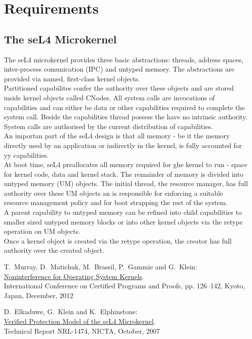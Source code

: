 \documentclass[pdftex,12pt,a4paper]{article}
\begin{document}
	
	\clearpage
	
	\section{Requirements}
	\subsection{The seL4 Microkernel}
	The seL4 microkernel provides three basic abstractions: threads, address spaces, inter-process comunication (IPC) and untyped memory. The abstractions are provided via named, first-class kernel objects. \\
	Partitioned capabilites confer the authority over these objects and are stored inside kernel objects called CNodes. 
	All system calls are invocations of capabilities and can either be data or other capabilities required to complete the system call. 
	Beside the capabilities thread possess the have no intrinsic authority. System calls are authorised by the current distribution of capabilities. \\
	An importan part of the seL4 design is that all memory - be it the memory directly used by an application or indirectly in the kernel, is fully accounted for yy capabilities. \\
	At boot time, seL4 preallocates all memory required for ghe kernel to run - space for kernel code, data and kernel stack. The remainder of memory is divided into untyped memory (UM) objects. The initial thread, the resource manager, has full authority over these UM objects an is responsible for enforcing a suitable resource management policy and for boot strapping the rest of the system. \\
	A parent capability to untyped memory can be refined into child capabilities to smaller sized untyped memory
blocks or into other kernel objects via the retype operation on UM objects. \\
Once a kernel object is created via the retype operation, the creator has full authority over the created object.
	
	
	\cleardoublepage
	\begin{thebibliography}{99}

	T.\ Murray, D.\ Matichuk, M.\ Brassil, P.\ Gammie and G.\ Klein:	\\ 
	\href{http://www.ssrg.nicta.com/publications/nicta_full_text/6004.pdf}{%
		Noninterference for Operating System Kernels}. \\
    International Conference on Certified Programs and Proofs, pp. 126–142, Kyoto, Japan, December, 2012

	D.\ Elkaduwe, G.\ Klein and K.\ Elphinstone:	\\ 
	\href{http://ts.data61.csiro.au/publications/nicta_full_text/1474.pdf}{%
		Verified Protection Model of the seL4 Microkernel}. \\
   	Technical Report NRL-1474, NICTA, October, 2007

\end{thebibliography}
	
\end{document}
